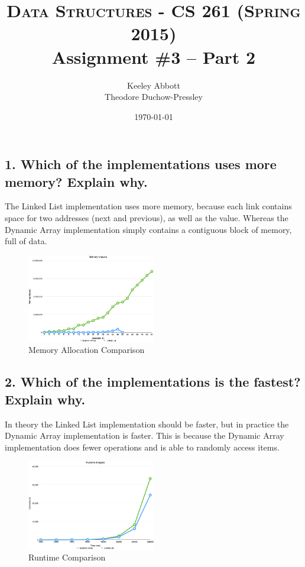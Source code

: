 \documentclass[letter,11pt]{scrartcl}
\title{
  \normalfont \normalsize
  \textsc{Data Structures - CS 261 (Spring 2015)} \\
  \huge Assignment \#3 -- Part 2
}
\author{Keeley Abbott
\\ Theodore Duchow-Pressley}
\date{\normalsize\today}
\begin{document}
\maketitle


\subsection*{1. Which of the implementations uses more memory? Explain why.}

The Linked List implementation uses more memory, because each link contains
space for two addresses (next and previous), as well as the value. Whereas the
Dynamic Array implementation simply contains a contiguous block of memory, full of data.

\begin{figure}[H]
  \centering
  \includegraphics[width=0.5\textwidth]{memory}
  \caption{Memory Allocation Comparison}
\end{figure}


\subsection*{2. Which of the implementations is the fastest? Explain why.}

In theory the Linked List implementation should be faster, but in practice the
Dynamic Array implementation is faster. This is because the Dynamic Array
implementation does fewer operations and is able to randomly access items. 

\begin{figure}[H]
  \centering
  \includegraphics[width=0.5\textwidth]{runtime}
  \caption{Runtime Comparison}
\end{figure}
\end{document}
